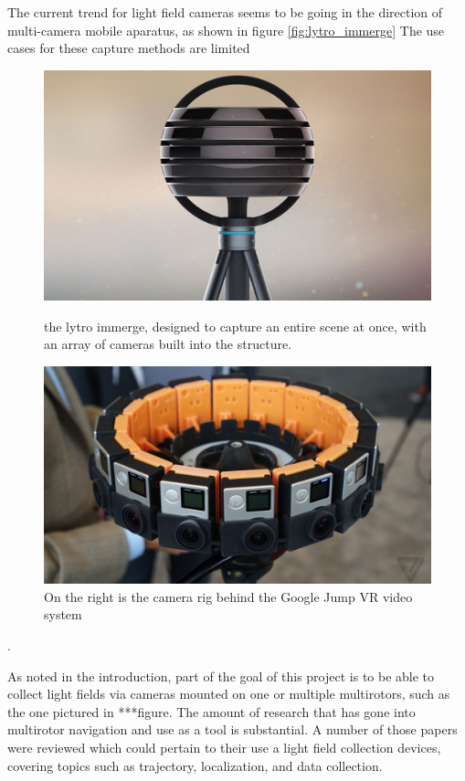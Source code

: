 \documentclass[12pt]{report}
\begin{document}
The current trend for light field cameras seems to be going in the direction of multi-camera mobile aparatus, as shown in figure \ref{fig:lytro_immerge}
The use cases for these capture methods are limited
\begin{figure}[!ht]
	\centering
	\begin{minipage}{0.45\textwidth}
		\centering
		\includegraphics[scale=0.08]{lytro_immerge.jpg}
		\caption{the lytro immerge, designed to capture an entire scene at once, with an array of cameras built into the structure.}
		\label{fig:lytro_immerge}
	\end{minipage}\hfill
	\begin{minipage}{0.45\textwidth}
		\centering
		\includegraphics[scale=0.12]{jump_vr_video_cameras.jpg}
		\caption{On the right is the camera rig behind the Google Jump VR video system \cite{Anderson16}}
		\label{fig:jump_cameras}
	\end{minipage}
\end{figure}. 

As noted in the introduction, part of the goal of this project is to be able to collect light fields via cameras mounted on one or multiple multirotors, such as the one pictured in ***figure. The amount of research that has gone into multirotor navigation and use as a tool is substantial. A number of those papers were reviewed which could pertain to their use a light field collection devices, covering topics such as trajectory, localization, and data collection. 
\end{document}
